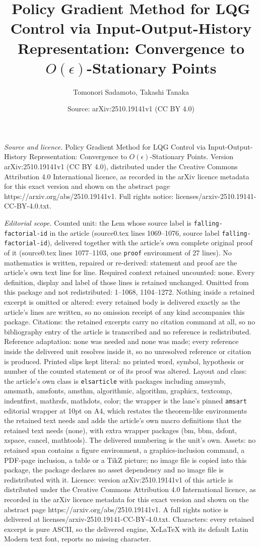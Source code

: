\documentclass[10pt,a4paper]{amsart}
\title[Policy Gradient Method for LQG Control via Input-Output-Hist]{Policy Gradient Method for LQG Control via Input-Output-History Representation: Convergence to $O(\epsilon)$-Stationary Points}
\author{Tomonori Sadamoto, Takashi Tanaka}
\date{Source: arXiv:2510.19141v1 (CC BY 4.0)}
\begin{document}
\maketitle

\noindent\emph{Source and licence.} Policy Gradient Method for LQG Control via Input-Output-History Representation: Convergence to $O(\epsilon)$-Stationary Points. Version arXiv:2510.19141v1 (CC BY 4.0), distributed under the Creative Commons Attribution 4.0 International licence, as recorded in the arXiv licence metadata for this exact version and shown on the abstract page https://arxiv.org/abs/2510.19141v1. Full rights notice: licenses/arxiv-2510.19141-CC-BY-4.0.txt.\par\smallskip

\noindent\textit{Editorial scope.} Counted unit: the Lem whose source label is \texttt{falling-factorial-id} in the article (source0.tex lines 1069--1076, source label \texttt{falling-factorial-id}), delivered together with the article's own complete original proof of it (source0.tex lines 1077--1103, one \texttt{proof} environment of 27 lines). No mathematics is written, repaired or re-derived: statement and proof are the article's own text line for line. Required context retained uncounted: none. Every definition, display and label of those lines is retained unchanged. Omitted from this package and not redistributed: 1--1068, 1104--1272. Nothing inside a retained excerpt is omitted or altered: every retained body is delivered exactly as the article's lines are written, so no omission receipt of any kind accompanies this package. Citations: the retained excerpts carry no citation command at all, so no bibliography entry of the article is transcribed and no reference is redistributed. Reference adaptation: none was needed and none was made; every reference inside the delivered unit resolves inside it, so no unresolved reference or citation is produced. Printed slips kept literal: no printed word, symbol, hypothesis or number of the counted statement or of its proof was altered. Layout and class: the article's own class is \texttt{elsarticle} with packages including amssymb, amsmath, amsfonts, amsthm, algorithmic, algorithm, graphicx, textcomp, indentfirst, mathrsfs, mathdots, color; the wrapper is the lane's pinned \texttt{amsart} editorial wrapper at 10pt on A4, which restates the theorem-like environments the retained text needs and adds the article's own macro definitions that the retained text needs (none), with extra wrapper packages (bm, bbm, dsfont, xspace, cancel, mathtools). The delivered numbering is the unit's own. Assets: no retained span contains a figure environment, a graphics-inclusion command, a PDF-page inclusion, a table or a TikZ picture; no image file is copied into this package, the package declares no asset dependency and no image file is redistributed with it. Licence: version arXiv:2510.19141v1 of this article is distributed under the Creative Commons Attribution 4.0 International licence, as recorded in the arXiv licence metadata for this exact version and shown on the abstract page https://arxiv.org/abs/2510.19141v1. A full rights notice is delivered at licenses/arxiv-2510.19141-CC-BY-4.0.txt. Characters: every retained excerpt is pure ASCII, so the delivered engine, XeLaTeX with its default Latin Modern text font, reports no missing character.
\end{document}
